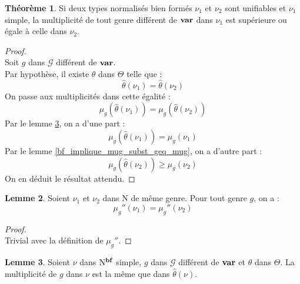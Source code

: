 \documentclass[a4paper]{report}
\newenvironment{preuve} 
  {\begin{proof}~\\} 
  {\end{proof}}
\theoremstyle{definition}
\newtheorem{theoreme}{Théorème}
\newtheorem{lemme}[theoreme]{Lemme}
\newcommand{\G}{\mathscr{G}}
\newcommand{\N}{\mathrm{N}}
\begin{document}
\begin{theoreme} \label{thm_cond2}
  Si deux types normalisés bien formés $\nu_1$ et $\nu_2$ sont unifiables et $\nu_1$ simple, la multiplicité de tout genre différent de $\bold{var}$ dans $\nu_1$ est supérieure ou égale à celle dans $\nu_2$.
\end{theoreme}

\begin{preuve}
  Soit $g$ dans $\G$ différent de $\bold{var}$. \\
  Par hypothèse, il existe $\theta$ dans $\Theta$ telle que :
  \[ \hat\theta (\nu_1) = \hat\theta (\nu_2) \]
  On passe aux multiplicités dans cette égalité :
  \[ \mu_g (\hat\theta (\nu_1)) = \mu_g (\hat\theta (\nu_2)) \]
  Par le lemme \ref{bf_simple_implique_mu_eq_mu_subst}, on a d'une part :
  \[ \mu_g (\hat\theta (\nu_1)) = \mu_g (\nu_1) \]
  Par le lemme \ref{bf_implique_mug_subst_geq_mug}, on a d'autre part :
  \[ \mu_g (\hat\theta (\nu_2)) \geqslant \mu_g (\nu_2) \]
  On en déduit le résultat attendu.
\end{preuve}

\begin{lemme} \label{genre_eq_implique_mug''_eq}
  Soient $\nu_1$ et $\nu_2$ dans $\N$ de même genre. Pour tout genre $g$, on a :
  \[ \mu_g'' (\nu_1) = \mu_g'' (\nu_2) \]
\end{lemme}

\begin{preuve}
  Trivial avec la définition de $\mu_g''$.
\end{preuve}

\begin{lemme} \label{bf_simple_implique_mu_eq_mu_subst}
  Soient $\nu$ dans $\N^{\bold{bf}}$ simple, $g$ dans $\G$ différent de $\bold{var}$ et $\theta$ dans $\Theta$. La multiplicité de $g$ dans $\nu$ est la même que dans $\hat\theta (\nu)$.
\end{lemme}
\end{document}
